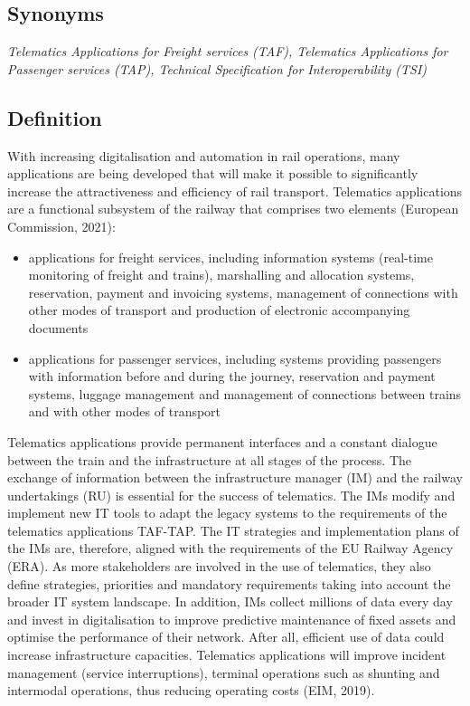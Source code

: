 \documentclass[
]{book}
\providecommand{\tightlist}{%
  \setlength{\itemsep}{0pt}\setlength{\parskip}{0pt}}
\begin{document}
\hypertarget{synonyms-19}{%
\subsection*{Synonyms}\label{synonyms-19}}

\emph{Telematics Applications for Freight services (TAF), Telematics Applications for Passenger services (TAP), Technical Specification for Interoperability (TSI)}

\hypertarget{definition-21}{%
\subsection*{Definition}\label{definition-21}}

With increasing digitalisation and automation in rail operations, many applications are being developed that will make it possible to significantly increase the attractiveness and efficiency of rail transport. Telematics applications are a functional subsystem of the railway that comprises two elements (European Commission, 2021):

\begin{itemize}
\tightlist
\item
  applications for freight services, including information systems (real-time monitoring of freight and trains), marshalling and allocation systems, reservation, payment and invoicing systems, management of connections with other modes of transport and production of electronic accompanying documents
\item
  applications for passenger services, including systems providing passengers with information before and during the journey, reservation and payment systems, luggage management and management of connections between trains and with other modes of transport
\end{itemize}

Telematics applications provide permanent interfaces and a constant dialogue between the train and the infrastructure at all stages of the process. The exchange of information between the infrastructure manager (IM) and the railway undertakings (RU) is essential for the success of telematics. The IMs modify and implement new IT tools to adapt the legacy systems to the requirements of the telematics applications TAF-TAP. The IT strategies and implementation plans of the IMs are, therefore, aligned with the requirements of the EU Railway Agency (ERA). As more stakeholders are involved in the use of telematics, they also define strategies, priorities and mandatory requirements taking into account the broader IT system landscape. In addition, IMs collect millions of data every day and invest in digitalisation to improve predictive maintenance of fixed assets and optimise the performance of their network. After all, efficient use of data could increase infrastructure capacities. Telematics applications will improve incident management (service interruptions), terminal operations such as shunting and intermodal operations, thus reducing operating costs (EIM, 2019).
\end{document}
